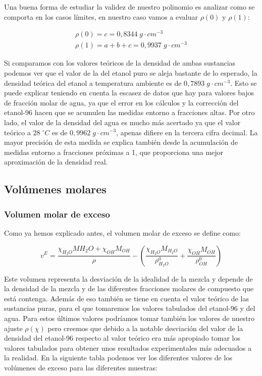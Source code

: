 \documentclass[a4paper,12pt,titlepage]{article}
\begin{document}
Una buena forma de estudiar la validez de nuestro polinomio es analizar como se comporta en los casos límites, en nuestro caso vamos a evaluar $\rho(0)$ y $\rho(1)$:

\begin{equation}
    \begin{gathered}
        \rho(0) = c = 0,8344 \; g\cdot cm^{-3} \\
        \rho(1) = a+b+c = 0,9937 \; g \cdot cm^{-3}
    \end{gathered}
\end{equation}

Si comparamos con los valores teóricos de la densidad de ambas sustancias podemos ver que el valor de la del etanol puro se aleja bastante de lo esperado, la densidad teórica del etanol a temperatura ambiente es de $0,7893 \;g\cdot cm^{-3}$. Esto se puede explicar teniendo en cuenta la escasez de datos que hay para valores bajos de fracción molar de agua, ya que el error en los cálculos y la corrección del etanol-96 hacen que se acumulen las medidas entorno a fracciones altas. Por otro lado, el valor de la densidad del agua es mucho más acertado ya que el valor teórico a $28 \;^{\circ}C$ es de  $0,9962 \;g\cdot cm^{-3}$, apenas difiere en la tercera cifra decimal. La mayor precisión de esta medida se explica también desde la acumulación de medidas entorno a fracciones próximas a 1, que proporciona una mejor aproximación de la densidad real.


\subsection{Volúmenes molares}

\subsubsection{Volumen molar de exceso}

Como ya hemos explicado antes, el volumen molar de exceso se define como:

\begin{equation}
    v^{E} = \frac{\chi_{H_2O}M{H_2O} + \chi_{OH}M_{OH}}{\rho} - \left( \frac{\chi_{H_2O}M_{H_2O}}{\rho_{H_2O}^0} + \frac{\chi_{OH}M_{OH}}{\rho_{OH}^0} \right)
\end{equation}

Este volumen representa la desviación de la idealidad de la mezcla y depende de la densidad de la mezcla y de las diferentes fracciones molares de compuesto que está contenga. Además de eso también se tiene en cuenta el valor teórico de las sustancias puras, para el que tomaremos los valores tabulados del etanol-96 y del agua. Para estos últimos valores podríamos tomar también los valores de nuestro ajuste $\rho(\chi)$ pero creemos que debido a la notable desviación del valor de la densidad del etanol-96 respecto al valor teórico era más apropiado tomar los valores tabulados para obtener unos resultados experimentales más adecuados a la realidad. En la siguiente tabla podemos ver los diferentes valores de los volúmenes de exceso para las diferentes muestras:
\end{document}
